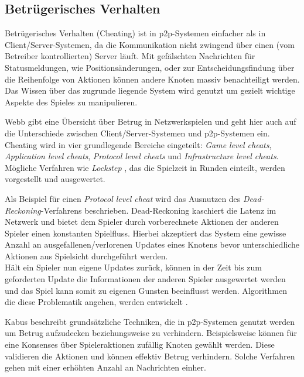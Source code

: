 \subsection{Betrügerisches Verhalten}
\label{chap:grundlagen:cheating}
Betrügerisches Verhalten (Cheating) ist in p2p-Systemen einfacher als in Client/Server-Systemen, da die Kommunikation nicht zwingend über einen (vom Betreiber kontrollierten) Server läuft. Mit gefälschten Nachrichten für Statusmeldungen, wie Positionsänderungen, oder zur Entscheidungsfindung über die Reihenfolge von Aktionen können andere Knoten massiv benachteiligt werden. Das Wissen über das zugrunde liegende System wird genutzt um gezielt wichtige Aspekte des Spieles zu manipulieren.

Webb \cite{Webb2007Cheating} gibt eine Übersicht über Betrug in Netzwerkspielen und geht hier auch auf die Unterschiede zwischen Client/Server-Systemen und p2p-Systemen ein. Cheating wird in vier grundlegende Bereiche eingeteilt: \emph{Game level cheats}, \emph{Application level cheats}, \emph{Protocol level cheats} und \emph{Infrastructure level cheats}. Mögliche Verfahren wie \emph{Lockstep} \cite{Baughman2007}, das die Spielzeit in Runden einteilt, werden vorgestellt und ausgewertet.

Als Beispiel für einen \emph{Protocol level cheat} wird das Ausnutzen des \emph{Dead-Reckoning}-Verfahrens \cite{Pantel2002} beschrieben. Dead-Reckoning kaschiert die Latenz im Netzwerk und bietet dem Spieler durch vorberechnete Aktionen der anderen Spieler einen konstanten Spielfluss. Hierbei akzeptiert das System eine gewisse Anzahl an ausgefallenen/verlorenen Updates eines Knotens bevor unterschiedliche Aktionen aus Spielsicht durchgeführt werden.\\
Hält ein Spieler nun eigene Updates zurück, können in der Zeit bis zum geforderten Update die Informationen der anderen Spieler ausgewertet werden und das Spiel kann somit zu eigenen Gunsten beeinflusst werden. Algorithmen die diese Problematik angehen, werden entwickelt \cite{Aggarwal2005}.

Kabus \cite{Kabus2007Design, Kabus2009} beschreibt grundsätzliche Techniken, die in p2p-Systemen genutzt werden um Betrug aufzudecken beziehungsweise zu verhindern. Beispielsweise können für eine Konsenses über Spieleraktionen zufällig Knoten gewählt werden. Diese validieren die Aktionen und können effektiv Betrug verhindern. Solche Verfahren gehen mit einer erhöhten Anzahl an Nachrichten einher.

